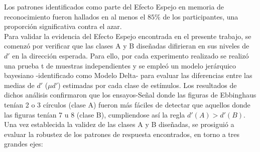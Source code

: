 Los patrones identificados como parte del Efecto Espejo en memoria de reconocimiento fueron hallados en al menos el $85\%$ de los participantes, una proporción significativa contra el azar.\\

Para validar la evidencia del Efecto Espejo encontrada en el presente trabajo, se comenzó por verificar que las clases A y B diseñadas difirieran en sus niveles de $d'$ en la dirección esperada. Para ello, por cada experimento realizado se realizó una prueba t de muestras independientes y se empleó un modelo jerárquico bayesiano -identificado como Modelo Delta- para evaluar las diferencias entre las medias de $d'$  ($\mu d'$) estimadas por cada clase de estímulos. Los resultados de dichos análisis confirmaron que los ensayos-Señal donde las figuras de Ebbinghaus tenían 2 o 3 círculos (clase A) fueron más fáciles de detectar que aquellos donde las figuras tenían 7 u 8 (clase B), cumpliendose así la regla $d'(A) > d'(B)$.\\


Una vez establecida la validez de las clases A y B diseñadas, se prosiguió a evaluar la robustez de los patrones de respuesta encontrados, en torno a tres grandes ejes:\\

